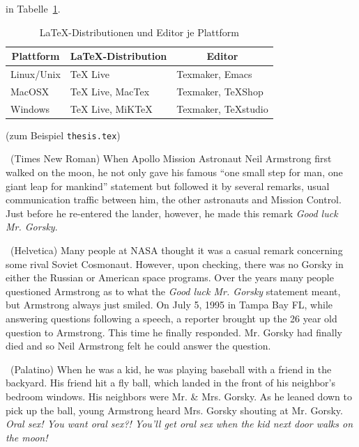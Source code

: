 \documentclass[11pt,a4paper]{report}
\begin{document}
in Tabelle~\ref{tab:disteditplattform}.
\begin{table}
\centering
\begin{tabular}{|l||l|l|}
\hline
\multicolumn{1}{|c|}{\textbf{Plattform}} & 
\multicolumn{1}{|c|}{\textbf{\LaTeX-Distribution}} & 
\multicolumn{1}{|c|}{\textbf{Editor}} \\\hline\hline
Linux/Unix & TeX Live         & Texmaker, Emacs \\\hline
MacOSX     & TeX Live, MacTex & Texmaker, TeXShop \\\hline
Windows    & TeX Live, MiKTeX & Texmaker, TeXstudio \\\hline   
\end{tabular}
\caption{\LaTeX-Distributionen und Editor je Plattform}
\label{tab:disteditplattform}
\end{table}

(zum Beispiel \verb|thesis.tex|)



\noindent\parbox[t]{\textwidth}{
\fontsize{11}{13pt}\selectfont \ 
(Times New Roman) When Apollo Mission Astronaut Neil Armstrong first 
walked on the moon, he not only gave his famous ``one small step 
for man, one giant leap for mankind'' statement but followed it by 
several remarks, usual communication traffic between him, the other
astronauts and Mission Control. 
Just before he re-entered the lander, however, he made this 
remark \textit{Good luck Mr. Gorsky}.
}

\noindent\parbox[t]{\textwidth}{
\fontsize{11}{13pt}\selectfont \ 
(Helvetica) Many people at NASA thought it was a casual remark concerning 
some rival Soviet Cosmonaut. 
However, upon checking, there was no Gorsky in either the
Russian or American space programs. 
Over the years many people questioned Armstrong as to what 
the \textit{Good luck Mr. Gorsky} statement meant, but Armstrong
always just smiled.
On July 5, 1995 in Tampa Bay FL, while answering questions following 
a speech, a reporter brought up the 26 year old question to Armstrong. 
This time he finally responded. Mr. Gorsky had finally died and so 
Neil Armstrong felt he could answer the question.
}

\noindent\parbox[t]{\textwidth}{
\fontsize{11}{13pt}\selectfont \ 
(Palatino) When he was a kid, he was playing baseball with a friend 
in the backyard. His friend hit a fly ball, which landed in the front 
of his neighbor's bedroom windows. 
His neighbors were Mr. \& Mrs. Gorsky.
As he leaned down to pick up the ball, young Armstrong heard 
Mrs. Gorsky shouting at Mr. Gorsky. 
\textit{Oral sex! You want oral sex?! You'll get oral sex when the 
  kid next door walks on the moon!}
}
\end{document}
